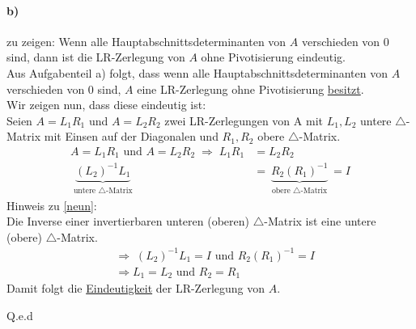 \paragraph*{b)}
zu zeigen: Wenn alle Hauptabschnittsdeterminanten von $A$ verschieden von 0 sind, dann ist die LR-Zerlegung von $A$ ohne Pivotisierung eindeutig.\\
\newline
Aus Aufgabenteil a) folgt, dass \glqq wenn alle Hauptabschnittsdeterminanten von $A$ verschieden von 0 sind, $A$ eine LR-Zerlegung ohne Pivotisierung \underline{besitzt}.\grqq\\
\newline
Wir zeigen nun, dass diese eindeutig ist:\\
\newline
Seien $ A = L_1R_1 $ und $ A = L_2R_2 $ zwei LR-Zerlegungen von A mit $L_1,L_2$ untere $\triangle$-Matrix mit Einsen auf der Diagonalen und $R_1,R_2$ obere $\triangle$-Matrix.
\begin{align}
	 A = L_1R_1 \text{ und } A = L_2R_2 \;\Rightarrow \; L_1R_1 &=  L_2R_2\\\label{neun}
	 \underbrace{(L_2)^{-1}L_1}_{\substack{\text{untere }\triangle\text{-Matrix}}}
	 &=  \underbrace{R_2(R_1)^{-1}}_{\substack{\text{obere }\triangle\text{-Matrix}}} = I
\end{align}
Hinweis zu \eqref{neun}:\\ Die Inverse einer invertierbaren unteren (oberen) $\triangle$-Matrix ist eine untere (obere) $\triangle$-Matrix.\\
\begin{align}
&\Rightarrow \; (L_2)^{-1}L_1 = I \text{ und } R_2(R_1)^{-1}=I\\
&\Rightarrow L_1=L_2 \text{ und } R_2=R_1
\end{align}
Damit folgt die \underline{Eindeutigkeit} der LR-Zerlegung von $A$.
\begin{flushright}Q.e.d\end{flushright}